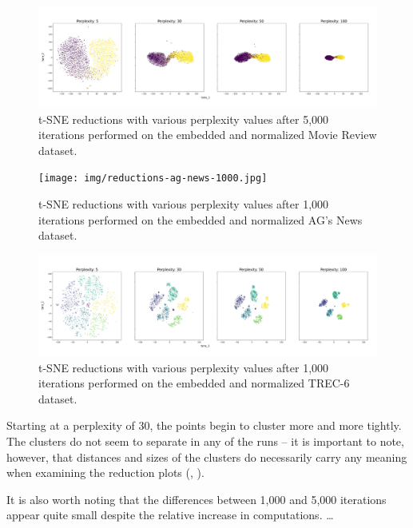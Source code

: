 \documentclass[english,bachelor,ul]{webisthesis} %
\begin{document}
\begin{figure}[htbp]
    \centering
    \includegraphics[width=1\textwidth]{img/reductions-mr-5000.jpg}
    \caption{t-SNE reductions with various perplexity values after 5,000 iterations performed on the embedded and normalized Movie Review dataset.}
    \label{fig:reductions-mr-5000}
\end{figure}

\begin{figure}[htbp]
    \centering
    \texttt{[image: img/reductions-ag-news-1000.jpg]}
    \caption{t-SNE reductions with various perplexity values after 1,000 iterations performed on the embedded and normalized AG's News dataset.}
    \label{fig:reductions-agnews-1000}
\end{figure}

\begin{figure}[htbp]
    \centering
    \includegraphics[width=1\textwidth]{img/reductions-trec-1000.jpg}
    \caption{t-SNE reductions with various perplexity values after 1,000 iterations performed on the embedded and normalized TREC-6 dataset.}
    \label{fig:reductions-trec-1000}
\end{figure}

\fi

Starting at a perplexity of 30, the points begin to cluster more and more tightly. The clusters do not seem to separate in any of the runs -- it is important to note, however, that distances and sizes of the clusters do necessarily carry any meaning when examining the reduction plots (\cite{wattenberg2016how}, \cite{vanHomepage}).

It is also worth noting that the differences between 1,000 and 5,000 iterations appear quite small despite the relative increase in computations. \dots
\end{document}
